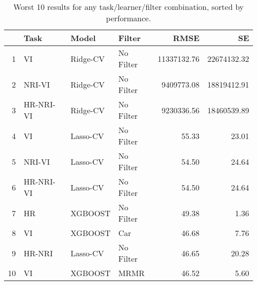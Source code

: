 \begin{table}[ht!]
\centering
\caption{Worst 10 results for any task/learner/filter combination, sorted by performance.} 
\label{tab:perf-worst-10}
\begin{tabular}{rlllrr}
  \hline
 & Task & Model & Filter & RMSE & SE \\ 
  \hline
1 & VI & Ridge-CV & No Filter & 11337132.76 & 22674132.32 \\ 
  2 & NRI-VI & Ridge-CV & No Filter & 9409773.08 & 18819412.91 \\ 
  3 & HR-NRI-VI & Ridge-CV & No Filter & 9230336.56 & 18460539.89 \\ 
  4 & VI & Lasso-CV & No Filter & 55.33 & 23.01 \\ 
  5 & NRI-VI & Lasso-CV & No Filter & 54.50 & 24.64 \\ 
  6 & HR-NRI-VI & Lasso-CV & No Filter & 54.50 & 24.64 \\ 
  7 & HR & XGBOOST & No Filter & 49.38 & 1.36 \\ 
  8 & VI & XGBOOST & Car & 46.68 & 7.76 \\ 
  9 & HR-NRI & Lasso-CV & No Filter & 46.65 & 20.28 \\ 
  10 & VI & XGBOOST & MRMR & 46.52 & 5.60 \\ 
   \hline
\end{tabular}
\end{table}
